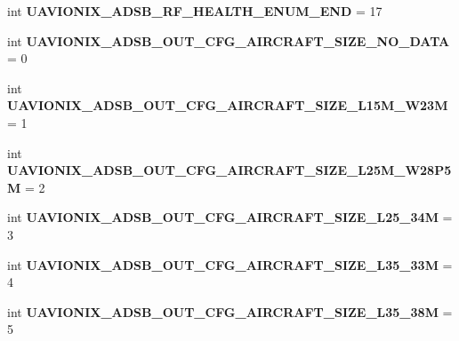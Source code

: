 \begin{DoxyCompactItemize}
\item 
\mbox{\label{namespacepymavlink_1_1dialects_1_1v10_a71add9bcc911e469d295c13866291172}} 
int {\bfseries U\+A\+V\+I\+O\+N\+I\+X\+\_\+\+A\+D\+S\+B\+\_\+\+R\+F\+\_\+\+H\+E\+A\+L\+T\+H\+\_\+\+E\+N\+U\+M\+\_\+\+E\+ND} = 17
\item 
\mbox{\label{namespacepymavlink_1_1dialects_1_1v10_ab83eac956e0d7403254b335b4c24d6c3}} 
int {\bfseries U\+A\+V\+I\+O\+N\+I\+X\+\_\+\+A\+D\+S\+B\+\_\+\+O\+U\+T\+\_\+\+C\+F\+G\+\_\+\+A\+I\+R\+C\+R\+A\+F\+T\+\_\+\+S\+I\+Z\+E\+\_\+\+N\+O\+\_\+\+D\+A\+TA} = 0
\item 
\mbox{\label{namespacepymavlink_1_1dialects_1_1v10_aa7feef96c595379f7d4a0998b82d84ae}} 
int {\bfseries U\+A\+V\+I\+O\+N\+I\+X\+\_\+\+A\+D\+S\+B\+\_\+\+O\+U\+T\+\_\+\+C\+F\+G\+\_\+\+A\+I\+R\+C\+R\+A\+F\+T\+\_\+\+S\+I\+Z\+E\+\_\+\+L15\+M\+\_\+\+W23M} = 1
\item 
\mbox{\label{namespacepymavlink_1_1dialects_1_1v10_af2cea57506da58fa780f6eca31d0b89b}} 
int {\bfseries U\+A\+V\+I\+O\+N\+I\+X\+\_\+\+A\+D\+S\+B\+\_\+\+O\+U\+T\+\_\+\+C\+F\+G\+\_\+\+A\+I\+R\+C\+R\+A\+F\+T\+\_\+\+S\+I\+Z\+E\+\_\+\+L25\+M\+\_\+\+W28\+P5M} = 2
\item 
\mbox{\label{namespacepymavlink_1_1dialects_1_1v10_a63d4468cc5a9ba507b8b4d171a51939b}} 
int {\bfseries U\+A\+V\+I\+O\+N\+I\+X\+\_\+\+A\+D\+S\+B\+\_\+\+O\+U\+T\+\_\+\+C\+F\+G\+\_\+\+A\+I\+R\+C\+R\+A\+F\+T\+\_\+\+S\+I\+Z\+E\+\_\+\+L25\+\_\+34M} = 3
\item 
\mbox{\label{namespacepymavlink_1_1dialects_1_1v10_ae840b884be89105afb659c66cad8a281}} 
int {\bfseries U\+A\+V\+I\+O\+N\+I\+X\+\_\+\+A\+D\+S\+B\+\_\+\+O\+U\+T\+\_\+\+C\+F\+G\+\_\+\+A\+I\+R\+C\+R\+A\+F\+T\+\_\+\+S\+I\+Z\+E\+\_\+\+L35\+\_\+33M} = 4
\item 
\mbox{\label{namespacepymavlink_1_1dialects_1_1v10_a48706104bd560ccf0088b46a85015b59}} 
int {\bfseries U\+A\+V\+I\+O\+N\+I\+X\+\_\+\+A\+D\+S\+B\+\_\+\+O\+U\+T\+\_\+\+C\+F\+G\+\_\+\+A\+I\+R\+C\+R\+A\+F\+T\+\_\+\+S\+I\+Z\+E\+\_\+\+L35\+\_\+38M} = 5

\end{DoxyCompactItemize}
